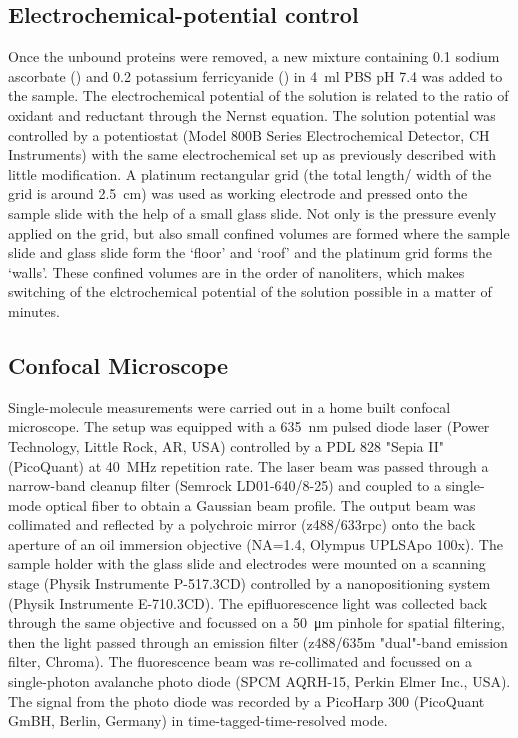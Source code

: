 \documentclass[journal=jacsat,manuscript=article]{achemso}
\begin{document}
\subsection{Electrochemical-potential control}
Once the unbound proteins were removed, a new mixture containing \SI{0.1}{\mM} sodium ascorbate () and \SI{0.2}{\mM} potassium ferricyanide (\ce{[Fe(CN)6^3-]}) in \SI{4}{\ml} PBS pH 7.4 was added to the sample.
The electrochemical potential of the solution is related to the ratio of oxidant and reductant through the Nernst equation.
The solution potential was controlled by a potentiostat (Model 800B Series Electrochemical Detector, CH Instruments) with the same electrochemical set up as previously described\cite{zhang2017gold} with little modification.
A platinum rectangular grid (the total length/ width of the grid is around \SI{2.5}{\cm}) was used as working electrode and pressed onto the sample slide with the help of a small glass slide. Not only is the pressure evenly applied on the grid, but also small confined volumes are formed where the sample slide and glass slide form the `floor' and `roof' and the platinum grid forms the `walls'.
These confined volumes are in the order of nanoliters, which makes switching of the elctrochemical potential of the solution possible in a matter of minutes.

\subsection{Confocal Microscope}
Single-molecule measurements were carried out in a home built confocal microscope.
The setup was equipped with a \SI{635}{\nm} pulsed diode laser (Power Technology, Little Rock, AR, USA) controlled by a PDL 828 "Sepia II" (PicoQuant) at \SI{40}{\MHz} repetition rate.
The laser beam was passed through a narrow-band cleanup filter (Semrock LD01-640/8-25) and coupled to a single-mode optical fiber to obtain a Gaussian beam profile.
The output beam was collimated and reflected by a polychroic mirror (z488/633rpc) onto the back aperture of an oil immersion objective (NA=1.4, Olympus UPLSApo 100x).
The sample holder with the glass slide and electrodes were mounted on a scanning stage (Physik Instrumente P-517.3CD) controlled by a nanopositioning system (Physik Instrumente E-710.3CD). 
The epifluorescence light was collected back through the same objective and focussed on a \SI{50}{\um} pinhole for spatial filtering, then the light passed through an emission filter (z488/635m "dual"-band emission filter, Chroma). 
The fluorescence beam was re-collimated and focussed on a single-photon avalanche photo diode (SPCM AQRH-15, Perkin Elmer Inc., USA).
The signal from the photo diode was recorded by a PicoHarp 300 (PicoQuant GmBH, Berlin, Germany) in time-tagged-time-resolved mode.
\end{document}
